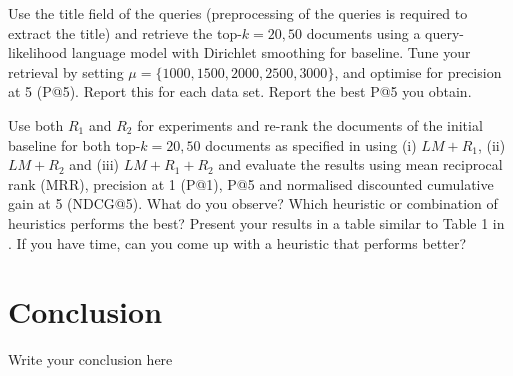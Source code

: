 \documentclass{sig-alternate}
\begin{document}
Use the title field of the queries (preprocessing of the queries is required to extract the title) and retrieve the top-$k = 20,50$ documents using a query-likelihood language model with Dirichlet smoothing for baseline. Tune your retrieval by setting $\mu = \{1000,1500,2000,2500,3000\}$, and optimise for precision at 5 (P@5). Report this for each data set. Report the best P@5 you obtain. 

Use both $R_1$ and $R_2$ for experiments and re-rank the documents of the initial baseline for both top-$k = 20,50$ documents as specified in \cite{woo2010achieving} using (i) $LM+R_1$, (ii) $LM+R_2$ and (iii) $LM+R_1+R_2$ and evaluate the results using mean reciprocal rank (MRR), precision at 1 (P@1), P@5 and normalised discounted cumulative gain at 5 (NDCG@5). What do you observe? Which heuristic or combination of heuristics performs the best? Present your results in a table similar to Table 1 in \cite{woo2010achieving}. If you have time, can you come up with a heuristic that performs better?

\section{Conclusion}
Write your conclusion here

\end{document}
